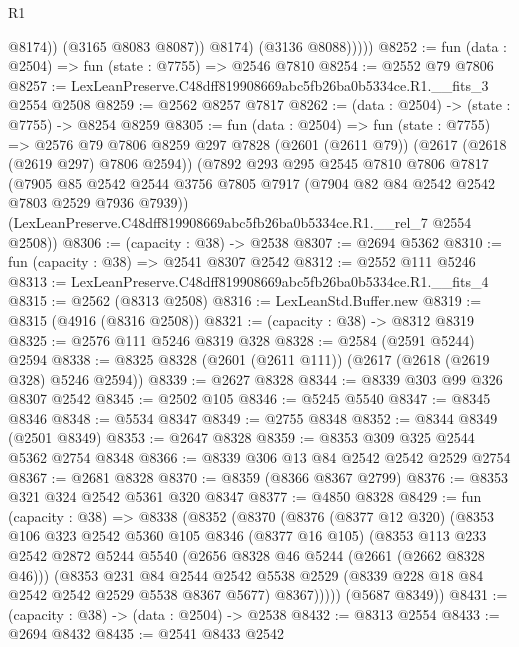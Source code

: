 \begin{lexlean}{R1}
\begin{coremodule}
                    @8174))
                (@3165 @8083 @8087))
              @8174)
            (@3136 @8088)))))
@8252 := fun (data : @2504) => fun (state : @7755) => @2546 @7810
@8254 := @2552 @79 @7806
@8257 := LexLeanPreserve.C48dff819908669abc5fb26ba0b5334ce.R1.__fits_3 @2554 @2508
@8259 := @2562 @8257 @7817
@8262 := (data : @2504) -> (state : @7755) -> @8254 @8259
@8305 := fun (data : @2504) =>
  fun (state : @7755) =>
  @2576
    @79
    @7806
    @8259
    @297
    @7828
    (@2601 (@2611 @79))
    (@2617 (@2618 (@2619 @297) @7806 @2594))
    (@7892
      @293
      @295
      @2545
      @7810
      @7806
      @7817
      (@7905 @85 @2542 @2544 @3756 @7805 @7917 (@7904 @82 @84 @2542 @2542 @7803 @2529 @7936 @7939))
      (LexLeanPreserve.C48dff819908669abc5fb26ba0b5334ce.R1.__rel_7 @2554 @2508))
@8306 := (capacity : @38) -> @2538
@8307 := @2694 @5362
@8310 := fun (capacity : @38) => @2541 @8307 @2542
@8312 := @2552 @111 @5246
@8313 := LexLeanPreserve.C48dff819908669abc5fb26ba0b5334ce.R1.__fits_4
@8315 := @2562 (@8313 @2508)
@8316 := LexLeanStd.Buffer.new
@8319 := @8315 (@4916 (@8316 @2508))
@8321 := (capacity : @38) -> @8312 @8319
@8325 := @2576 @111 @5246 @8319 @328
@8328 := @2584 (@2591 @5244) @2594
@8338 := @8325 @8328 (@2601 (@2611 @111)) (@2617 (@2618 (@2619 @328) @5246 @2594))
@8339 := @2627 @8328
@8344 := @8339 @303 @99 @326 @8307 @2542
@8345 := @2502 @105
@8346 := @5245 @5540
@8347 := @8345 @8346
@8348 := @5534 @8347
@8349 := @2755 @8348
@8352 := @8344 @8349 (@2501 @8349)
@8353 := @2647 @8328
@8359 := @8353 @309 @325 @2544 @5362 @2754 @8348
@8366 := @8339 @306 @13 @84 @2542 @2542 @2529 @2754
@8367 := @2681 @8328
@8370 := @8359 (@8366 @8367 @2799)
@8376 := @8353 @321 @324 @2542 @5361 @320 @8347
@8377 := @4850 @8328
@8429 := fun (capacity : @38) =>
  @8338
    (@8352
      (@8370
        (@8376
          (@8377 @12 @320)
          (@8353
            @106
            @323
            @2542
            @5360
            @105
            @8346
            (@8377 @16 @105)
            (@8353
              @113
              @233
              @2542
              @2872
              @5244
              @5540
              (@2656 @8328 @46 @5244 (@2661 (@2662 @8328 @46)))
              (@8353
                @231
                @84
                @2544
                @2542
                @5538
                @2529
                (@8339 @228 @18 @84 @2542 @2542 @2529 @5538 @8367 @5677)
                @8367)))))
      (@5687 @8349))
@8431 := (capacity : @38) -> (data : @2504) -> @2538
@8432 := @8313 @2554
@8433 := @2694 @8432
@8435 := @2541 @8433 @2542

\end{coremodule}
\end{lexlean}

